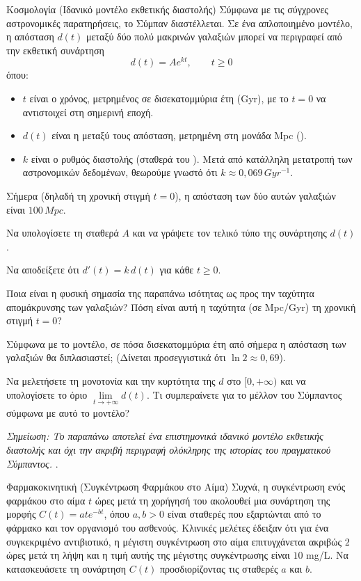 \begin{problhma}{Κοσμολογία (Ιδανικό μοντέλο εκθετικής διαστολής)}
Σύμφωνα με τις σύγχρονες αστρονομικές παρατηρήσεις, το Σύμπαν διαστέλλεται. Σε ένα απλοποιημένο μοντέλο, η απόσταση $d(t)$ μεταξύ δύο πολύ μακρινών γαλαξιών μπορεί να περιγραφεί από την εκθετική συνάρτηση
\[
  d(t)=Ae^{kt},\qquad t\geq 0
\]
όπου:
\begin{itemize}
  \item $t$ είναι ο χρόνος, μετρημένος σε δισεκατομμύρια έτη (\si{Gyr}), με το $t=0$ να αντιστοιχεί στη σημερινή εποχή.
  \item $d(t)$ είναι η μεταξύ τους απόσταση, μετρημένη στη μονάδα \si{Mpc} ().
  \item $k$ είναι ο ρυθμός διαστολής (σταθερά του ). Μετά από κατάλληλη μετατροπή των αστρονομικών δεδομένων, θεωρούμε γνωστό ότι $k \approx 0{,}069\,\si{Gyr^{-1}}$.
\end{itemize}
Σήμερα (δηλαδή τη χρονική στιγμή $t=0$), η απόσταση των δύο αυτών γαλαξιών είναι $100\,\si{Mpc}$.

\begin{alist}
  \item Να υπολογίσετε τη σταθερά $A$ και να γράψετε τον τελικό τύπο της συνάρτησης $d(t)$.
  \item Να αποδείξετε ότι $d'(t)=k\,d(t)$ για κάθε $t \ge 0$.
  \item Ποια είναι η φυσική σημασία της παραπάνω ισότητας ως προς την ταχύτητα απομάκρυνσης των γαλαξιών? Πόση είναι αυτή η ταχύτητα (σε \si{Mpc/Gyr}) τη χρονική στιγμή $t=0$?
  \item Σύμφωνα με το μοντέλο, σε πόσα δισεκατομμύρια έτη από σήμερα η απόσταση των γαλαξιών θα διπλασιαστεί; (Δίνεται προσεγγιστικά ότι $\ln 2 \approx 0{,}69$).
  \item Να μελετήσετε τη μονοτονία και την κυρτότητα της $d$ στο $[0,+\infty)$ και να υπολογίσετε το όριο $\displaystyle\lim\limits_{t\to+\infty}d(t)$. Τι συμπεραίνετε για το μέλλον του Σύμπαντος σύμφωνα με αυτό το μοντέλο?
\end{alist}

\textit{Σημείωση: Το παραπάνω αποτελεί ένα επιστημονικά ιδανικό μοντέλο εκθετικής διαστολής και όχι την ακριβή περιγραφή ολόκληρης της ιστορίας του πραγματικού Σύμπαντος.}
\cite{frieman2008darkEnergy}.
\end{problhma}

\begin{problhma}{Φαρμακοκινητική (Συγκέντρωση Φαρμάκου στο Αίμα)}
Συχνά, η συγκέντρωση ενός φαρμάκου στο αίμα $t$ ώρες μετά τη χορήγησή του ακολουθεί μια συνάρτηση της μορφής $C(t) = a t e^{-bt}$, όπου $a, b > 0$ είναι σταθερές που εξαρτώνται από το φάρμακο και τον οργανισμό του ασθενούς. 
Κλινικές μελέτες έδειξαν ότι για ένα συγκεκριμένο αντιβιοτικό, η μέγιστη συγκέντρωση στο αίμα επιτυγχάνεται ακριβώς $2$ ώρες μετά τη λήψη και η τιμή αυτής της μέγιστης συγκέντρωσης είναι $10$ \si{mg/L}. 
Να κατασκευάσετε τη συνάρτηση $C(t)$ προσδιορίζοντας τις σταθερές $a$ και $b$.
\end{problhma}

